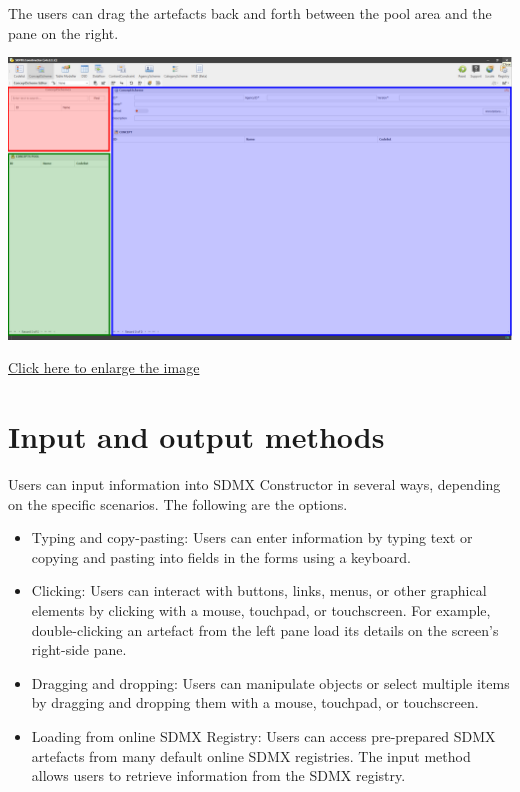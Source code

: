 \documentclass[
]{book}
\providecommand{\tightlist}{%
  \setlength{\itemsep}{0pt}\setlength{\parskip}{0pt}}
\theoremstyle{definition}
\theoremstyle{definition}
\theoremstyle{definition}
\theoremstyle{definition}
\theoremstyle{remark}
\begin{document}
The users can drag the artefacts back and forth between the pool area and the pane on the right.

\begin{center}\includegraphics[width=1\linewidth]{./images/image042} \end{center}

\href{images/image042.png}{Click here to enlarge the image}

\hypertarget{input-and-output-methods}{%
\section{Input and output methods}\label{input-and-output-methods}}

Users can input information into SDMX Constructor in several ways, depending on the specific scenarios. The following are the options.

\begin{itemize}
\tightlist
\item
  Typing and copy-pasting: Users can enter information by typing text or copying and pasting into fields in the forms using a keyboard.
\item
  Clicking: Users can interact with buttons, links, menus, or other graphical elements by clicking with a mouse, touchpad, or touchscreen. For example, double-clicking an artefact from the left pane load its details on the screen's right-side pane.
\item
  Dragging and dropping: Users can manipulate objects or select multiple items by dragging and dropping them with a mouse, touchpad, or touchscreen.
\item
  Loading from online SDMX Registry: Users can access pre-prepared SDMX artefacts from many default online SDMX registries. The input method allows users to retrieve information from the SDMX registry.
\end{itemize}
\end{document}
